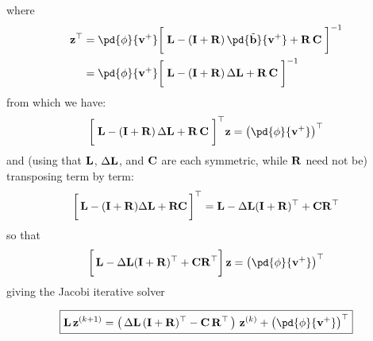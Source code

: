 \begin{derivation}
where
\begin{equation}
\begin{aligned}
    \z^\top
    & = \pd{\phi}{\vv^+}
    \bigg[\;
        \LL - \left(\I+\R\right)\pd{\tilde{\bb}}{\vv^+} + \R\,\C
    \;\bigg]^{-1} \\
    & = \pd{\phi}{\vv^+}\bigg[\;
        \LL - \left(\I+\R\right)\Delta \LL + \R\,\C
    \;\bigg]^{-1}
\end{aligned}
\end{equation}
from which we have:
\begin{equation*}
    \bigg[\; \LL - (\I+\R)\,\Delta \LL + \R\,\C \;\bigg]^\top\z = \left(\pd{\phi}{\vv^+}\right)^\top
\end{equation*}
and (using that $\mathbf{L}$, $\Delta\mathbf{L}$, and $\mathbf{C}$ are each symmetric, while $\mathbf{R}$ need not be) transposing term by term:
\begin{equation*}
    \bigg[\,\mathbf{L} - (\mathbf{I}+\mathbf{R})\Delta\mathbf{L} + \mathbf{R}\mathbf{C}\,\bigg]^\top
    =
    \mathbf{L} - \Delta\mathbf{L}(\mathbf{I}+\mathbf{R})^\top + \mathbf{C}\mathbf{R}^\top
\end{equation*}
so that
\begin{equation*}
    \bigg[\,\LL - \Delta\LL(\I+\R)^\top + \C\R^\top\bigg]\,\z = \left(\pd{\phi}{\vv^+}\right)^\top
\end{equation*}
giving the Jacobi iterative solver

\begin{equation}
\boxed{
    \LL\,\z^{(k+1)} = 
    \left(\,\Delta\LL\,(\I+\R)^\top - \C\,\R^\top\,\right)\,\z^{(k)} + \left(\pd{\phi}{\vv^+}\right)^\top
}
\end{equation}
\end{derivation}

